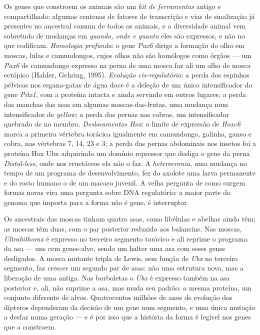 \begin{definition}\label{def:b3:developmental-genetics:evodevo}
Os genes que constroem os animais são um \emph{kit de ferramentas}
antigo e compartilhado: algumas centenas de fatores de transcrição e
vias de sinalização já presentes no ancestral comum de todos os animais,
e a diversidade animal vem sobretudo de mudanças em \emph{quando, onde e
quanto} eles são expressos, e não no que codificam. \emph{Homologia
profunda}: o gene \emph{Pax6} dirige a formação do olho em moscas, lulas
e camundongos, cujos olhos não são homólogos como órgãos --- um
\emph{Pax6} de camundongo expresso na perna de uma mosca faz ali um olho
de mosca ectópico (Halder, Gehring, 1995). \emph{Evolução
cis-regulatória}: a perda dos espinhos pélvicos nos esgana-gatas de água
doce é a deleção de um único intensificador do gene \emph{Pitx1}, com a
proteína intacta e ainda servindo em outros lugares; a perda das manchas
das asas em algumas moscas-das-frutas, uma mudança num intensificador de
\emph{yellow}; a perda das pernas nas cobras, um intensificador
quebrado de \emph{} no membro. \emph{Deslocamentos Hox}: o
limite de expressão de \emph{Hoxc6} marca a primeira vértebra torácica
igualmente em camundongo, galinha, ganso e cobra, nas vértebras 7, 14,
23 e 3; a perda das pernas abdominais nos insetos foi a proteína Hox Ubx
adquirindo um domínio repressor que desliga o gene da perna
\emph{Distal-less}, onde nos crustáceos ela não o faz. A
\emph{heterocronia}, uma mudança no tempo de um programa de
desenvolvimento, fez do axolote uma larva permanente e do rosto humano o
de um macaco juvenil. A velha pergunta de como surgem formas novas vira
uma pergunta sobre DNA regulatório: a maior parte do genoma que importa
para a forma não é gene, é interruptor.
\end{definition}

\begin{example}\label{ex:b3:developmental-genetics:four-wings}
Os ancestrais das moscas tinham quatro asas, como libélulas e abelhas
ainda têm; as moscas têm duas, com o par posterior reduzido aos
balancins. Nas moscas, \emph{Ultrabithorax} é expresso no terceiro
segmento torácico e ali reprime o programa da asa --- uns cem genes-alvo,
sendo um halter uma asa com esses genes desligados. A mosca mutante
tripla de Lewis, sem função de \emph{Ubx} no terceiro segmento, faz
crescer um segundo par de asas: não uma estrutura nova, mas a liberação
de uma antiga. Nas borboletas o \emph{Ubx} é expresso também na asa
posterior e, ali, não suprime a asa, mas muda seu padrão: a mesma
proteína, um conjunto diferente de alvos. Quatrocentos milhões de anos de
evolução dos dípteros dependeram da decisão de um gene num segmento, e
uma única mutação a desfaz numa geração --- e é por isso que a história
da forma é legível nos genes que a constroem.
\end{example}

